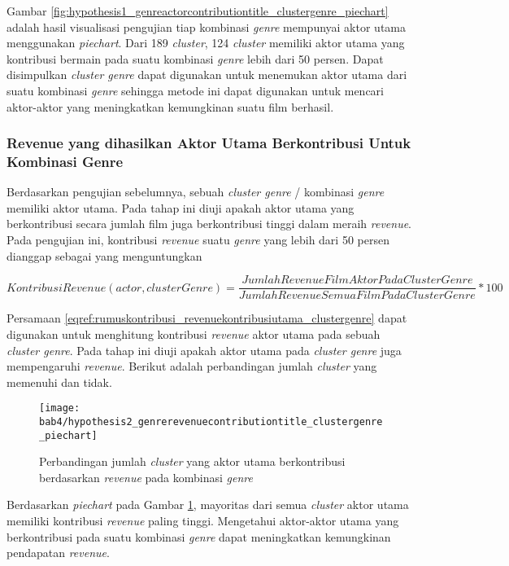 Gambar \ref{fig:hypothesis1_genreactorcontributiontitle_clustergenre_piechart}
adalah hasil visualisasi pengujian tiap kombinasi \textit{genre} mempunyai aktor utama menggunakan \textit{piechart}. Dari 189 \textit{cluster}, 124 \textit{cluster} memiliki aktor utama yang kontribusi bermain pada suatu kombinasi \textit{genre} lebih dari 50 persen. Dapat disimpulkan \textit{cluster genre} dapat digunakan untuk menemukan aktor utama dari suatu kombinasi \textit{genre} sehingga metode ini dapat digunakan untuk mencari aktor-aktor yang meningkatkan kemungkinan suatu film berhasil.


\subsubsection{Revenue yang dihasilkan Aktor Utama Berkontribusi Untuk Kombinasi Genre}
Berdasarkan pengujian sebelumnya, sebuah \textit{cluster genre} / kombinasi \textit{genre} memiliki aktor utama. Pada tahap ini diuji apakah aktor utama yang berkontribusi secara jumlah film juga berkontribusi tinggi dalam meraih \textit{revenue}. Pada pengujian ini, kontribusi \textit{revenue} suatu \textit{genre} yang lebih dari 50 persen dianggap sebagai yang menguntungkan 

\begin{equation}
KontribusiRevenue(actor,clusterGenre) = \frac{JumlahRevenueFilmAktorPadaClusterGenre}{JumlahRevenueSemuaFilmPadaClusterGenre} * 100
\label{eqref:rumuskontribusi_revenuekontribusiutama_clustergenre}
\end{equation}


Persamaan \ref{eqref:rumuskontribusi_revenuekontribusiutama_clustergenre} dapat digunakan untuk menghitung kontribusi \textit{revenue} aktor utama pada sebuah \textit{cluster genre}. Pada tahap ini diuji apakah aktor utama pada \textit{cluster genre} juga mempengaruhi \textit{revenue}. Berikut adalah perbandingan jumlah \textit{cluster} yang memenuhi dan tidak. 


\begin{figure}[H]
	\centering  
	\texttt{[image: bab4/hypothesis2\_genrerevenuecontributiontitle\_clustergenre\_piechart]}   
	\caption{Perbandingan jumlah \textit{cluster} yang aktor utama berkontribusi berdasarkan \textit{revenue} pada kombinasi \textit{genre} }	\label{fig:hypothesis2_genrerevenuecontributiontitle_clustergenre_piechart} 
\end{figure}

Berdasarkan \textit{piechart} pada Gambar \ref{fig:hypothesis2_genrerevenuecontributiontitle_clustergenre_piechart},  mayoritas dari semua \textit{cluster} aktor utama memiliki kontribusi \textit{revenue} paling tinggi. Mengetahui aktor-aktor utama yang berkontribusi pada suatu kombinasi \textit{genre} dapat meningkatkan kemungkinan pendapatan \textit{revenue}.

